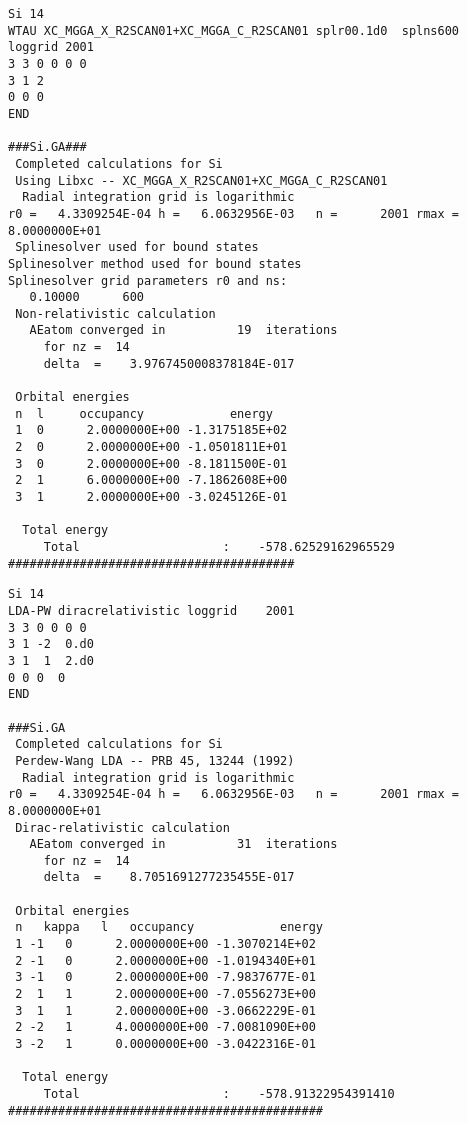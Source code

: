 \documentclass[11pt]{article}
\begin{document}
\begin{verbatim}
Si 14
WTAU XC_MGGA_X_R2SCAN01+XC_MGGA_C_R2SCAN01 splr00.1d0  splns600 loggrid 2001
3 3 0 0 0 0
3 1 2
0 0 0
END

###Si.GA###
 Completed calculations for Si
 Using Libxc -- XC_MGGA_X_R2SCAN01+XC_MGGA_C_R2SCAN01
  Radial integration grid is logarithmic 
r0 =   4.3309254E-04 h =   6.0632956E-03   n =      2001 rmax =   8.0000000E+01
 Splinesolver used for bound states
Splinesolver method used for bound states
Splinesolver grid parameters r0 and ns:
   0.10000      600
 Non-relativistic calculation
   AEatom converged in          19  iterations
     for nz =  14
     delta  =    3.9767450008378184E-017

 Orbital energies
 n  l     occupancy            energy
 1  0      2.0000000E+00 -1.3175185E+02
 2  0      2.0000000E+00 -1.0501811E+01
 3  0      2.0000000E+00 -8.1811500E-01
 2  1      6.0000000E+00 -7.1862608E+00
 3  1      2.0000000E+00 -3.0245126E-01

  Total energy
     Total                    :    -578.62529162965529     
########################################
\end{verbatim}



\begin{verbatim}
Si 14
LDA-PW diracrelativistic loggrid    2001
3 3 0 0 0 0
3 1 -2  0.d0
3 1  1  2.d0
0 0 0  0
END

###Si.GA
 Completed calculations for Si
 Perdew-Wang LDA -- PRB 45, 13244 (1992)
  Radial integration grid is logarithmic 
r0 =   4.3309254E-04 h =   6.0632956E-03   n =      2001 rmax =   8.0000000E+01
 Dirac-relativistic calculation
   AEatom converged in          31  iterations
     for nz =  14
     delta  =    8.7051691277235455E-017

 Orbital energies
 n   kappa   l   occupancy            energy
 1 -1   0      2.0000000E+00 -1.3070214E+02
 2 -1   0      2.0000000E+00 -1.0194340E+01
 3 -1   0      2.0000000E+00 -7.9837677E-01
 2  1   1      2.0000000E+00 -7.0556273E+00
 3  1   1      2.0000000E+00 -3.0662229E-01
 2 -2   1      4.0000000E+00 -7.0081090E+00
 3 -2   1      0.0000000E+00 -3.0422316E-01

  Total energy
     Total                    :    -578.91322954391410     
############################################
\end{verbatim}
\end{document}
